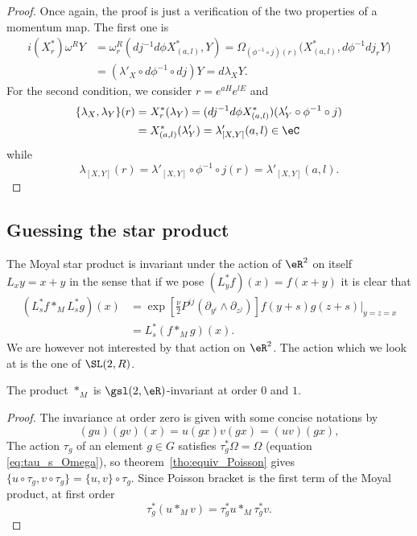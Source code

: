 \begin{proof}
	Once again, the proof is just a verification of the two properties of a momentum map. The first one is
	\begin{equation}
		\begin{split}
			i(X^*_r)\omega^R Y&=\omega^R_r(dj^{-1} d\phi X^*_{(a,l)},Y)
			=\Omega_{(\phi^{-1}\circ j)(r)}\big( X^*_{(a,l)},d\phi^{-1} dj_r Y \big)\\
			&=(\lambda'_X\circ d\phi^{-1}\circ dj)Y
			=d\lambda_X Y.
		\end{split}
	\end{equation}
	For the second condition, we consider $r=e^{aH}e^{lE}$ and
	\begin{equation}
		\begin{split}
			\{ \lambda_X,\lambda_Y \}(r)&=X^*_r(\lambda_Y)
			=(dj^{-1} d\phi X^*_{(a,l)})(\lambda'_Y\circ \phi^{-1}\circ j)\\
			&=X^*_{(a,l)}(\lambda'_Y)
			=\lambda'_{[X,Y]}(a,l)\in\eC
		\end{split}
	\end{equation}
	while
	\[
		\lambda_{[X,Y]}(r)=\lambda'_{[X,Y]}\circ\phi^{-1}\circ j(r)=\lambda'_{[X,Y]}(a,l).
	\]
\end{proof}

\subsection{Guessing the star product}

The Moyal star product is invariant under the action of $\eR^2$ on itself $L_xy=x+y$ in the sense that if we pose $(L_y^*f)(x)=f(x+y)$ it is clear that
\begin{equation}
	\begin{split}
		(L_s^*f\ast_M L_s^*g)(x)&=
		\exp\left[{\displaystyle\frac{\nu}{2}P^{ij}(\partial_{y^i}\wedge\partial_{z^j})}\right]f(y+s)g(z+s)|_{y=z=x}\\
		&=L^*_s(f\ast_M g)(x).
	\end{split}
\end{equation}
We are however not interested by that action on $\eR^2$. The action which we look at is the one of $\SL(2,R)$.

\begin{proposition}
	The product $\ast_M$ is $\gsl(2,\eR)$-invariant at order $0$ and $1$.
\end{proposition}

\begin{proof}
	The invariance at order zero is given with some concise notations by
	\[
		(gu)(gv)(x)=u(gx)v(gx)=(uv)(gx),
	\]
	The action $\tau_g$ of an element $g\in G$ satisfies $\tau_g^*\Omega=\Omega$ (equation \eqref{eq:tau_s_Omega}), so  theorem~\ref{tho:equiv_Poisson} gives $\{u\circ\tau_g,v\circ\tau_g\}=\{u,v\}\circ\tau_g$.  Since Poisson bracket is the first term of the Moyal product, at first order
	\[
		\tau_g^*(u\ast_M v)=\tau_g^*u\ast_M\tau_g^*v.
	\]


\end{proof}

